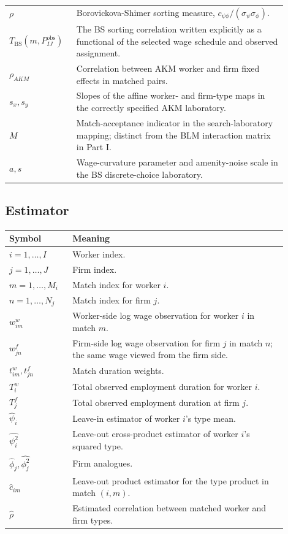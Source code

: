 \documentclass[11pt]{article}
\begin{document}
\begin{center}
\begin{tabular}{>{\raggedright\arraybackslash}p{0.20\linewidth}p{0.70\linewidth}}
$\rho$ & Borovickova-Shimer sorting measure, $c_{\psi\phi}/(\sigma_\psi\sigma_\phi)$. \\
$T_{\mathrm{BS}}(m,P_{IJ}^{\mathrm{obs}})$ & The BS sorting correlation written explicitly as a functional of the selected wage schedule and observed assignment. \\
$\rho_{AKM}$ & Correlation between AKM worker and firm fixed effects in matched pairs. \\
$s_x,s_y$ & Slopes of the affine worker- and firm-type maps in the correctly
specified AKM laboratory. \\
$M$ & Match-acceptance indicator in the search-laboratory mapping; distinct from the BLM interaction matrix in Part I. \\
$a,s$ & Wage-curvature parameter and amenity-noise scale in the BS discrete-choice laboratory. \\
\bottomrule
\end{tabular}
\end{center}

\subsection*{Estimator}

\begin{center}
\begin{tabular}{>{\raggedright\arraybackslash}p{0.20\linewidth}p{0.70\linewidth}}
\toprule
Symbol & Meaning \\
\midrule
$i=1,\ldots,I$ & Worker index. \\
$j=1,\ldots,J$ & Firm index. \\
$m=1,\ldots,M_i$ & Match index for worker $i$. \\
$n=1,\ldots,N_j$ & Match index for firm $j$. \\
$w^w_{im}$ & Worker-side log wage observation for worker $i$ in match $m$. \\
$w^f_{jn}$ & Firm-side log wage observation for firm $j$ in match $n$; the same wage viewed from the firm side. \\
$t^w_{im},t^f_{jn}$ & Match duration weights. \\
$T_i^w$ & Total observed employment duration for worker $i$. \\
$T_j^f$ & Total observed employment duration at firm $j$. \\
$\widehat\psi_i$ & Leave-in estimator of worker $i$'s type mean. \\
$\widehat{\psi_i^2}$ & Leave-out cross-product estimator of worker $i$'s squared type. \\
$\widehat\phi_j,\widehat{\phi_j^2}$ & Firm analogues. \\
$\widehat c_{im}$ & Leave-out product estimator for the type product in match $(i,m)$. \\
$\widehat\rho$ & Estimated correlation between matched worker and firm types. \\
\bottomrule
\end{tabular}
\end{center}
\end{document}
